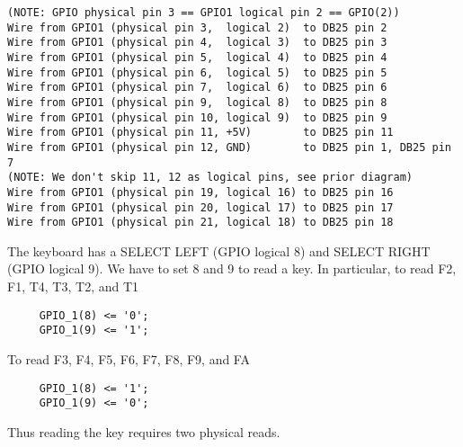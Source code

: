 \begin{verbatim}
(NOTE: GPIO physical pin 3 == GPIO1 logical pin 2 == GPIO(2))
Wire from GPIO1 (physical pin 3,  logical 2)  to DB25 pin 2
Wire from GPIO1 (physical pin 4,  logical 3)  to DB25 pin 3
Wire from GPIO1 (physical pin 5,  logical 4)  to DB25 pin 4
Wire from GPIO1 (physical pin 6,  logical 5)  to DB25 pin 5
Wire from GPIO1 (physical pin 7,  logical 6)  to DB25 pin 6
Wire from GPIO1 (physical pin 9,  logical 8)  to DB25 pin 8
Wire from GPIO1 (physical pin 10, logical 9)  to DB25 pin 9
Wire from GPIO1 (physical pin 11, +5V)        to DB25 pin 11
Wire from GPIO1 (physical pin 12, GND)        to DB25 pin 1, DB25 pin 7
(NOTE: We don't skip 11, 12 as logical pins, see prior diagram)
Wire from GPIO1 (physical pin 19, logical 16) to DB25 pin 16
Wire from GPIO1 (physical pin 20, logical 17) to DB25 pin 17
Wire from GPIO1 (physical pin 21, logical 18) to DB25 pin 18

\end{verbatim}

The keyboard has a SELECT LEFT (GPIO logical 8) and SELECT RIGHT
(GPIO logical 9). We have to set 8 and 9 to read a key. In particular,
to read F2, F1, T4, T3, T2, and T1
\begin{verbatim}
     GPIO_1(8) <= '0'; 
     GPIO_1(9) <= '1';
\end{verbatim}
To read F3, F4, F5, F6, F7, F8, F9, and FA
\begin{verbatim}
     GPIO_1(8) <= '1';
     GPIO_1(9) <= '0';
\end{verbatim}
Thus reading the key requires two physical reads.

